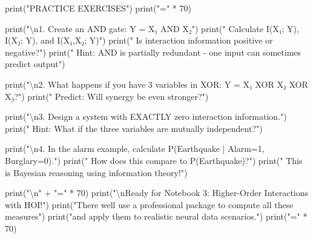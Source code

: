 \documentclass[
  11pt,
  letterpaper,
  oneside,
  openany]{book}
\newenvironment{Shaded}{\begin{snugshade}}{\end{snugshade}}
\newcommand{\BuiltInTok}[1]{\textcolor[rgb]{0.00,0.23,0.31}{#1}}
\newcommand{\CharTok}[1]{\textcolor[rgb]{0.13,0.47,0.30}{#1}}
\newcommand{\DecValTok}[1]{\textcolor[rgb]{0.68,0.00,0.00}{#1}}
\newcommand{\NormalTok}[1]{\textcolor[rgb]{0.00,0.23,0.31}{#1}}
\newcommand{\OperatorTok}[1]{\textcolor[rgb]{0.37,0.37,0.37}{#1}}
\newcommand{\StringTok}[1]{\textcolor[rgb]{0.13,0.47,0.30}{#1}}
\begin{document}
\begin{Shaded}
\begin{Highlighting}[]
\BuiltInTok{print}\NormalTok{(}\StringTok{"PRACTICE EXERCISES"}\NormalTok{)}
\BuiltInTok{print}\NormalTok{(}\StringTok{"="} \OperatorTok{*} \DecValTok{70}\NormalTok{)}

\BuiltInTok{print}\NormalTok{(}\StringTok{"}\CharTok{\textbackslash{}n}\StringTok{1. Create an AND gate: Y = X₁ AND X₂"}\NormalTok{)}
\BuiltInTok{print}\NormalTok{(}\StringTok{"   Calculate I(X₁; Y), I(X₂; Y), and I(X₁,X₂; Y)"}\NormalTok{)}
\BuiltInTok{print}\NormalTok{(}\StringTok{"   Is interaction information positive or negative?"}\NormalTok{)}
\BuiltInTok{print}\NormalTok{(}\StringTok{"   Hint: AND is partially redundant {-} one input can sometimes predict output"}\NormalTok{)}

\BuiltInTok{print}\NormalTok{(}\StringTok{"}\CharTok{\textbackslash{}n}\StringTok{2. What happens if you have 3 variables in XOR: Y = X₁ XOR X₂ XOR X₃?"}\NormalTok{)}
\BuiltInTok{print}\NormalTok{(}\StringTok{"   Predict: Will synergy be even stronger?"}\NormalTok{)}

\BuiltInTok{print}\NormalTok{(}\StringTok{"}\CharTok{\textbackslash{}n}\StringTok{3. Design a system with EXACTLY zero interaction information."}\NormalTok{)}
\BuiltInTok{print}\NormalTok{(}\StringTok{"   Hint: What if the three variables are mutually independent?"}\NormalTok{)}

\BuiltInTok{print}\NormalTok{(}\StringTok{"}\CharTok{\textbackslash{}n}\StringTok{4. In the alarm example, calculate P(Earthquake | Alarm=1, Burglary=0)."}\NormalTok{)}
\BuiltInTok{print}\NormalTok{(}\StringTok{"   How does this compare to P(Earthquake)?"}\NormalTok{)}
\BuiltInTok{print}\NormalTok{(}\StringTok{"   This is Bayesian reasoning using information theory!"}\NormalTok{)}

\BuiltInTok{print}\NormalTok{(}\StringTok{"}\CharTok{\textbackslash{}n}\StringTok{"} \OperatorTok{+} \StringTok{"="} \OperatorTok{*} \DecValTok{70}\NormalTok{)}
\BuiltInTok{print}\NormalTok{(}\StringTok{"}\CharTok{\textbackslash{}n}\StringTok{Ready for Notebook 3: Higher{-}Order Interactions with HOI!"}\NormalTok{)}
\BuiltInTok{print}\NormalTok{(}\StringTok{"There we\textquotesingle{}ll use a professional package to compute all these measures"}\NormalTok{)}
\BuiltInTok{print}\NormalTok{(}\StringTok{"and apply them to realistic neural data scenarios."}\NormalTok{)}
\BuiltInTok{print}\NormalTok{(}\StringTok{"="} \OperatorTok{*} \DecValTok{70}\NormalTok{)}
\end{Highlighting}
\end{Shaded}
\end{document}
